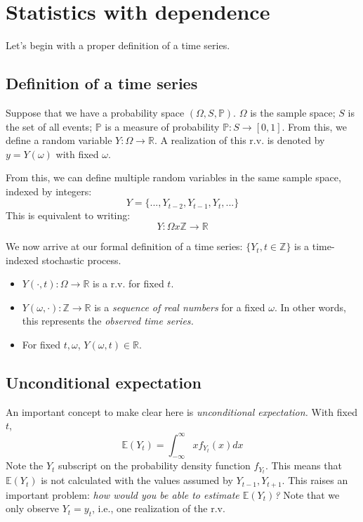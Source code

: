 \documentclass[11pt, a4paper]{report}
\theoremstyle{plain}
\theoremstyle{plain}
\theoremstyle{remark}
\begin{document}
\section{Statistics with dependence}

Let's begin with a proper definition of a time series. 

\subsection{Definition of a time series}

Suppose that we have a probability space $(\Omega, S, \mathbb{P})$. $\Omega$ is the sample space; $S$ is the set of all events; $\mathbb{P}$ is a measure of probability $\mathbb{P}: S \rightarrow [0,1]$. From this, we define a random variable $Y: \Omega \rightarrow \mathbb{R}$. A realization of this r.v. is denoted by $y = Y(\omega)$ with fixed $\omega$.

From this, we can define multiple random variables in the same sample space, indexed by integers:
$$	Y = \{..., Y_{t-2}, Y_{t-1}, Y_t, ...\} $$
This is equivalent to writing:
$$ Y: \Omega x \mathbb{Z} \rightarrow \mathbb{R}$$

We now arrive at our formal definition of a time series: $\{Y_t, t \in \mathbb{Z} \}$ is a time-indexed stochastic process.
\begin{itemize}
	\item $Y(\cdot, t): \Omega \rightarrow \mathbb{R}$ is a r.v. for fixed $t$.
	\item $Y(\omega, \cdot): \mathbb{Z} \rightarrow \mathbb{R}$ is a \textit{sequence of real numbers} for a fixed $\omega$. In other words, this represents the \textit{observed time series.}
	\item For fixed $t, \omega$, $Y(\omega, t) \in \mathbb{R}$.
\end{itemize}

\subsection{Unconditional expectation}

An important concept to make clear here is \textit{unconditional expectation.} With fixed $t$, 
$$ \mathbb{E}(Y_t) = \int_{-\infty}^{\infty} x f_{Y_t}(x) dx $$
Note the $Y_t$ subscript on the probability density function $f_{Y_t}$. This means that $\mathbb{E}(Y_t)$ is not calculated with the values assumed by $Y_{t-1}, Y_{t+1}$. This raises an important problem: \textit{how would you be able to estimate $\mathbb{E}(Y_t)$?} Note that we only observe $Y_t = y_t$, i.e., one realization of the r.v.
\end{document}
